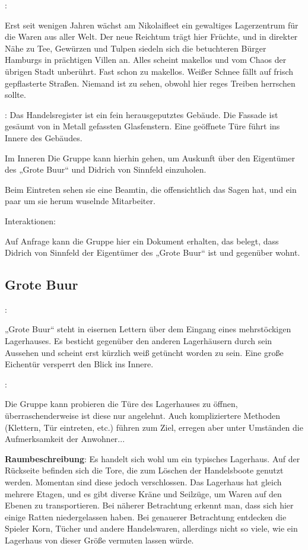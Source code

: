 :

Erst seit wenigen Jahren wächst am Nikolaifleet ein gewaltiges Lagerzentrum für die Waren aus aller Welt. Der neue Reichtum trägt hier Früchte, und in direkter Nähe zu Tee, Gewürzen und Tulpen siedeln sich die betuchteren Bürger Hamburgs in prächtigen Villen an. Alles scheint makellos und vom Chaos der übrigen Stadt unberührt. Fast schon zu makellos. Weißer Schnee fällt auf frisch gepflasterte Straßen. Niemand ist zu sehen, obwohl hier reges Treiben herrschen sollte.


:
Das Handelsregister ist ein fein herausgeputztes Gebäude. Die Fassade ist gesäumt von in Metall gefassten Glasfenstern. Eine geöffnete Türe führt ins Innere des Gebäudes.

Im Inneren
Die Gruppe kann hierhin gehen, um Auskunft über den Eigentümer des „Grote Buur“ und Didrich von Sinnfeld einzuholen.

Beim Eintreten sehen sie eine Beamtin, die offensichtlich das Sagen hat, und ein paar um sie herum wuselnde Mitarbeiter.

Interaktionen:

Auf Anfrage kann die Gruppe hier ein Dokument erhalten, das belegt, dass Didrich von Sinnfeld der Eigentümer des „Grote Buur“ ist und gegenüber wohnt.



\subsection*{Grote Buur}
\label{"grote buur"}

:

„Grote Buur“ steht in eisernen Lettern über dem Eingang eines mehrstöckigen Lagerhauses. Es besticht gegenüber den anderen Lagerhäusern durch sein Aussehen und scheint erst kürzlich weiß getüncht worden zu sein. Eine große Eichentür versperrt den Blick ins Innere.

:

Die Gruppe kann probieren die Türe des Lagerhauses zu öffnen, überraschenderweise ist diese nur angelehnt. Auch kompliziertere Methoden (Klettern, Tür eintreten, etc.) führen zum Ziel, erregen aber unter Umständen die Aufmerksamkeit der Anwohner...

\textbf{Raumbeschreibung}: Es handelt sich wohl um ein typisches Lagerhaus. Auf der Rückseite befinden sich die Tore, die zum Löschen der Handelsboote genutzt werden. Momentan sind diese jedoch verschlossen. Das Lagerhaus hat gleich mehrere Etagen, und es gibt diverse Kräne und Seilzüge, um Waren auf den Ebenen zu transportieren. Bei näherer Betrachtung erkennt man, dass sich hier einige Ratten niedergelassen haben. Bei genauerer Betrachtung entdecken die Spieler Korn, Tücher und andere Handelswaren, allerdings nicht so viele, wie ein Lagerhaus von dieser Größe vermuten lassen würde.


